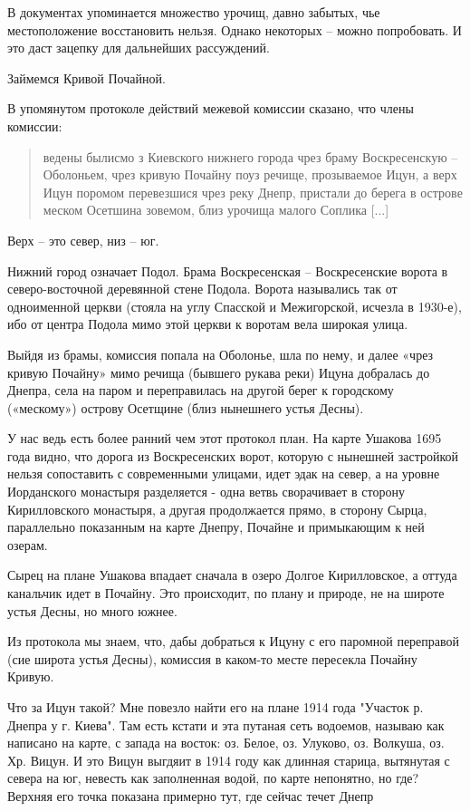В документах упоминается множество урочищ, давно забытых, чье местоположение восстановить нельзя. Однако некоторых – можно попробовать. И это даст зацепку для дальнейших рассуждений.

Займемся Кривой Почайной.

В упомянутом протоколе действий межевой комиссии сказано, что члены комиссии:

\begin{quotation}
ведены былисмо з Киевского нижнего города чрез браму Воскресенскую – Оболоньем, чрез кривую Почайну поуз речище, прозываемое Ицун, а верх Ицун поромом перевезшися чрез реку Днепр, пристали до берега в острове меском Осетшина зовемом, близ урочища малого Соплика [...]
\end{quotation}

Верх – это север, низ – юг.

Нижний город означает Подол. Брама Воскресенская – Воскресенские ворота в северо-восточной деревянной стене Подола. Ворота назывались так от одноименной церкви (стояла на углу Спасской и Межигорской, исчезла в 1930-е), ибо от центра Подола мимо этой церкви к воротам вела широкая улица.

Выйдя из брамы, комиссия попала на Оболонье, шла по нему, и далее «чрез кривую Почайну»   мимо речища (бывшего рукава реки) Ицуна добралась до Днепра, села на паром и переправилась на другой берег к городскому («мескому») острову Осетщине (близ нынешнего устья Десны).

У нас ведь есть более ранний чем этот протокол план. На карте Ушакова 1695 года видно, что дорога из Воскресенских ворот, которую с нынешней застройкой нельзя сопоставить с современными улицами, идет эдак на север, а на уровне Иорданского монастыря разделяется - одна ветвь сворачивает в сторону Кирилловского монастыря, а другая продолжается прямо, в сторону Сырца, параллельно показанным на карте Днепру, Почайне и примыкающим к ней озерам.

Сырец на плане Ушакова впадает сначала в озеро Долгое Кирилловское, а оттуда канальчик идет в Почайну. Это происходит, по плану и природе, не на широте устья Десны, но много южнее.

Из протокола мы знаем, что, дабы добраться к Ицуну с его паромной переправой (сие широта устья Десны), комиссия в каком-то месте пересекла Почайну Кривую.

Что за Ицун такой? Мне повезло найти его на плане 1914 года "Участок р. Днепра у г. Киева". Там есть кстати и эта путаная сеть водоемов, называю как написано на карте, с запада на восток: оз. Белое, оз. Улуково, оз. Волкуша, оз. Хр. Вицун. И это Вицун выгдяит в 1914 году как длинная старица, вытянутая с севера на юг,  невесть как заполненная водой, по карте непонятно, но где? Верхняя его точка показана примерно тут, где сейчас течет Днепр

